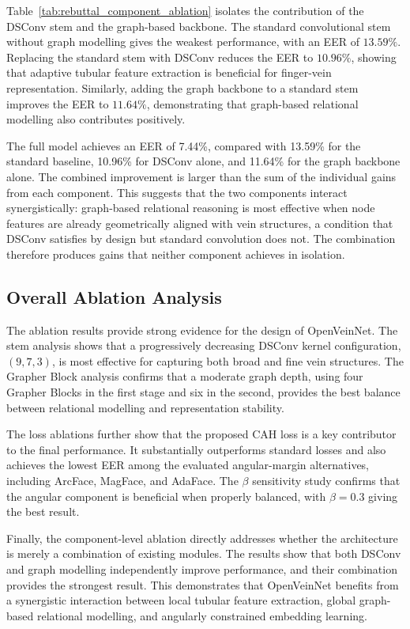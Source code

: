 \documentclass[10pt,journal,compsoc]{IEEEtran}
\begin{document}
Table~\ref{tab:rebuttal_component_ablation} isolates the contribution of the DSConv stem and the graph-based backbone. The standard convolutional stem without graph modelling gives the weakest performance, with an EER of $13.59\%$. Replacing the standard stem with DSConv reduces the EER to $10.96\%$, showing that adaptive tubular feature extraction is beneficial for finger-vein representation. Similarly, adding the graph backbone to a standard stem improves the EER to $11.64\%$, demonstrating that graph-based relational modelling also contributes positively.

The full model achieves an EER of 7.44\%, compared with
13.59\% for the standard baseline, 10.96\% for DSConv alone,
and 11.64\% for the graph backbone alone. The combined
improvement is larger than the sum of the individual gains
from each component.  This suggests that
the two components interact synergistically: graph-based
relational reasoning is most effective when node features
are already geometrically aligned with vein structures, a
condition that DSConv satisfies by design but standard
convolution does not. The combination therefore produces
gains that neither component achieves in isolation.



\subsection{Overall Ablation Analysis}

The ablation results provide strong evidence for the design of OpenVeinNet. The stem analysis shows that a progressively decreasing DSConv kernel configuration, $(9,7,3)$, is most effective for capturing both broad and fine vein structures. The Grapher Block analysis confirms that a moderate graph depth, using four Grapher Blocks in the first stage and six in the second, provides the best balance between relational modelling and representation stability.

The loss ablations further show that the proposed CAH loss is a key contributor to the final performance. It substantially outperforms standard losses and also achieves the lowest EER among the evaluated angular-margin alternatives, including ArcFace, MagFace, and AdaFace. The $\beta$ sensitivity study confirms that the angular component is beneficial when properly balanced, with $\beta=0.3$ giving the best result.

Finally, the component-level ablation directly addresses whether the architecture is merely a combination of existing modules. The results show that both DSConv and graph modelling independently improve performance, and their combination provides the strongest result. This demonstrates that OpenVeinNet benefits from a synergistic interaction between local tubular feature extraction, global graph-based relational modelling, and angularly constrained embedding learning.
\end{document}
